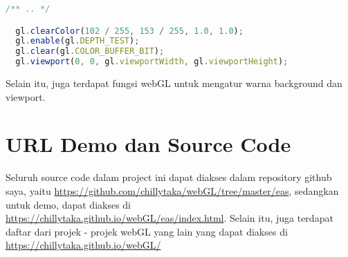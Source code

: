 \begin{lstlisting}[language=javascript, label={lst: eventListener}, caption={mengatur eventListener}]
  /** .. */

  gl.clearColor(102 / 255, 153 / 255, 1.0, 1.0);
  gl.enable(gl.DEPTH_TEST);
  gl.clear(gl.COLOR_BUFFER_BIT);
  gl.viewport(0, 0, gl.viewportWidth, gl.viewportHeight);
\end{lstlisting}

Selain itu, juga terdapat fungsi webGL untuk mengatur warna background dan viewport.

\section*{URL Demo dan Source Code}
Seluruh source code dalam project ini dapat diakses dalam repository github saya, yaitu \url{https://github.com/chillytaka/webGL/tree/master/eas}, sedangkan untuk demo, dapat diakses di \url{https://chillytaka.github.io/webGL/eas/index.html}. Selain itu, juga terdapat daftar dari projek - projek webGL yang lain yang dapat diakses di \url{https://chillytaka.github.io/webGL/}
